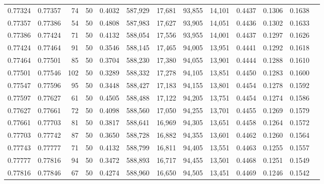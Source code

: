 \begin{tabular}{rrrrrrrrrrrrr}
0.77324 & 0.77357 &    74 &  50 &                                     0.4032 & 587,929 &  17,681 &  93,855 &  14,101 & 0.4437 & 0.1306 & 0.1638 \\
0.77357 & 0.77386 &    54 &  50 &                                     0.4808 & 587,983 &  17,627 &  93,905 &  14,051 & 0.4436 & 0.1302 & 0.1633 \\
0.77386 & 0.77424 &    71 &  50 &                                     0.4132 & 588,054 &  17,556 &  93,955 &  14,001 & 0.4437 & 0.1297 & 0.1626 \\
0.77424 & 0.77464 &    91 &  50 &                                     0.3546 & 588,145 &  17,465 &  94,005 &  13,951 & 0.4441 & 0.1292 & 0.1618 \\
0.77464 & 0.77501 &    85 &  50 &                                     0.3704 & 588,230 &  17,380 &  94,055 &  13,901 & 0.4444 & 0.1288 & 0.1610 \\
0.77501 & 0.77546 &   102 &  50 &                                     0.3289 & 588,332 &  17,278 &  94,105 &  13,851 & 0.4450 & 0.1283 & 0.1600 \\
0.77547 & 0.77596 &    95 &  50 &                                     0.3448 & 588,427 &  17,183 &  94,155 &  13,801 & 0.4454 & 0.1278 & 0.1592 \\
0.77597 & 0.77627 &    61 &  50 &                                     0.4505 & 588,488 &  17,122 &  94,205 &  13,751 & 0.4454 & 0.1274 & 0.1586 \\
0.77627 & 0.77661 &    72 &  50 &                                     0.4098 & 588,560 &  17,050 &  94,255 &  13,701 & 0.4455 & 0.1269 & 0.1579 \\
0.77661 & 0.77703 &    81 &  50 &                                     0.3817 & 588,641 &  16,969 &  94,305 &  13,651 & 0.4458 & 0.1264 & 0.1572 \\
0.77703 & 0.77742 &    87 &  50 &                                     0.3650 & 588,728 &  16,882 &  94,355 &  13,601 & 0.4462 & 0.1260 & 0.1564 \\
0.77743 & 0.77777 &    71 &  50 &                                     0.4132 & 588,799 &  16,811 &  94,405 &  13,551 & 0.4463 & 0.1255 & 0.1557 \\
0.77777 & 0.77816 &    94 &  50 &                                     0.3472 & 588,893 &  16,717 &  94,455 &  13,501 & 0.4468 & 0.1251 & 0.1549 \\
0.77816 & 0.77846 &    67 &  50 &                                     0.4274 & 588,960 &  16,650 &  94,505 &  13,451 & 0.4469 & 0.1246 & 0.1542 \\

\end{tabular}
